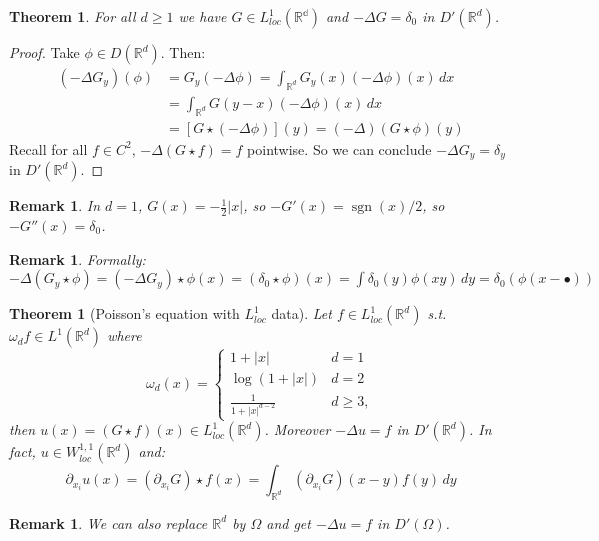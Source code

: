 \documentclass{report}
\theoremstyle{tommy}
\newtheorem{thm}[defn]{Theorem}
\newtheorem{rem}[defn]{Remark}
\newcommand{\sgn}{\operatorname{sgn}}
\begin{document}
  
  \begin{thm}
    For all \(d \ge 1\) we have \(G \in L_{loc}^1(\mathbb{R^d})\) and \(- \Delta G = \delta_0\) in \(D'(\mathbb{R}^d)\).
  \end{thm}

  \begin{proof}
    Take \(\phi \in D(\mathbb{R}^d)\). Then:
    \begin{align*}
      (- \Delta G_y)(\phi) 
      &= G_y(-\Delta \phi)
      = \int_{\mathbb{R}^d} G_y(x) (-\Delta \phi)(x) \, dx \\
      &= \int_{\mathbb{R}^d} G(y-x) (-\Delta \phi)(x) \, dx \\
      &= [G \star (-\Delta \phi)](y) = (-\Delta)(G \star \phi)(y)
    \end{align*}
    Recall for all \(f \in C^2\), \(-\Delta (G \star f) = f\) pointwise. So we can conclude \(-\Delta G_y = \delta_y\) in \(D'(\mathbb{R}^d)\).
  \end{proof}
  
  \begin{rem}
    In \(d = 1\), \(G(x) = - \frac{1}{2}|x|\), so \(-G'(x) = \sgn(x)/2\), so \(-G''(x) = \delta_0\).
  \end{rem}

  \begin{rem}
    Formally: \(-\Delta(G_y \star \phi) = (-\Delta G_y) \star \phi(x) = (\delta_0 \star \phi)(x) = \int \delta_0(y) \phi(x y) \, dy = \delta_0 (\phi(x-\bullet))\)
  \end{rem}

  \begin{thm}[Poisson's equation with \(L_{loc}^1\) data]\label{PoissonsequationwithL1locdata}
    Let \(f \in L_{loc}^1(\mathbb{R}^d)\) s.t. \(\omega_d f \in L^1(\mathbb{R}^d)\) where 
    \[\omega_d(x) = \begin{cases}
      1 + |x| & d = 1 \\ \log(1 + |x|) & d=2 \\ \frac{1}{1 + |x|^{d-2}} & d \ge 3,
    \end{cases}\]
    then \(u(x) = (G\star f)(x) \in L_{loc}^1(\mathbb{R}^d)\). Moreover \(-\Delta u = f\) in \(D'(\mathbb{R}^d)\). In fact, \(u \in W_{loc}^{1,1}(\mathbb{R}^d)\) and:
    \[\partial_{x_i} u(x) = (\partial_{x_i} G) \star f(x) = \int_{\mathbb{R}^d} (\partial_{x_i} G)(x-y)f(y) \, dy\]
  \end{thm}

  \begin{rem}
    We can also replace \(\mathbb{R}^d\) by \(\Omega\) and get \(- \Delta u = f\) in \(D'(\Omega)\). 
  \end{rem}
\end{document}
